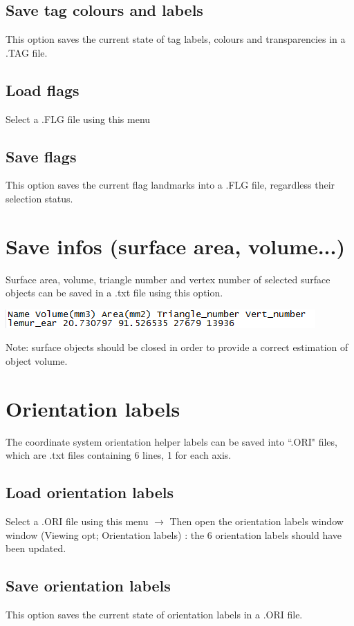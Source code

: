 \subsection{Save tag colours and labels}
This option saves the current state of tag labels, colours and transparencies in a .TAG file.

\subsection{Load flags}
Select a .FLG file using this menu

\subsection{Save flags}
This option saves the current flag landmarks into a .FLG file, regardless their selection status.

\section{Save infos (surface area, volume...)}
\noindent
\begin{minipage}{0.55\textwidth}

Surface area, volume, triangle number and
vertex number of selected surface objects can be
saved in a .txt file using this option.
\end{minipage}  
 \begin{minipage}{0.45\textwidth}\centering
  \includegraphics[scale=0.4]{images/File/Infos.png}
 \end{minipage} 
\noindent

Note: surface objects should be closed in order to provide a correct estimation of object volume.
\section{Orientation labels}
The coordinate system orientation helper labels can be saved into ``.ORI" files, which are .txt files
containing 6 lines, 1 for each axis.


\subsection{Load orientation labels}
Select a .ORI file using this menu $\rightarrow$ Then open the orientation labels window window (Viewing opt;
Orientation labels) : the 6 orientation labels should have been updated.

\subsection{Save orientation labels}
This option saves the current state of orientation labels in a .ORI file.

